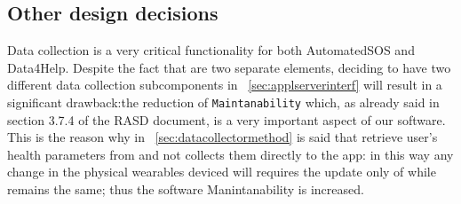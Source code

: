\documentclass[../DD0.tex]{subfiles}
\begin{document}
  \subsection{Other design decisions}
  \label{sec:designdecisions}
  Data collection is a very critical functionality for both AutomatedSOS and Data4Help.
  Despite the fact that are two separate elements, deciding to have two different data collection subcomponents in ~\ref{sec:applserverinterf} will result in a significant drawback:the reduction of \texttt{Maintanability} which, as already said in section 3.7.4 of the RASD document, is a very important aspect of our software.
  This is the reason why in ~\ref{sec:datacollectormethod} is said that \EmergencyDetector  retrieve user's health parameters from \DataCollector  and not collects them directly to the app: in this way any change in the physical wearables deviced will requires the update only of \DataCollector  while \EmergencyDetector  remains the same; thus the software Manintanability is increased.  
\end{document}
